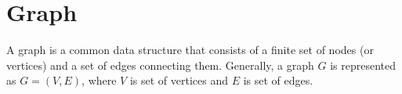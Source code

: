 \documentclass[a4paper,11pt]{book}
\begin{document}
%
%
%
%	
%	
%	
%		

\section{Graph}

\noindent A graph is a common data structure that consists of a finite set of nodes (or vertices) and a set of edges connecting them. Generally, a graph $G$ is represented as $G = (V, E)$, where $V$ is set of vertices and $E$ is set of edges.
\end{document}
